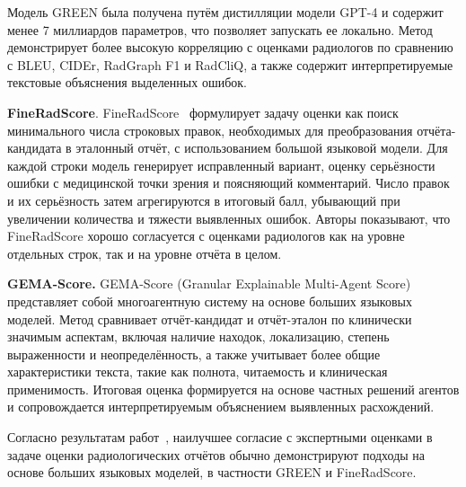 Модель GREEN была получена путём дистилляции модели GPT-4 и содержит менее 7 миллиардов параметров, что позволяет запускать ее локально. Метод демонстрирует более высокую корреляцию с оценками радиологов по сравнению с BLEU, CIDEr, RadGraph F1 и RadCliQ, а также содержит интерпретируемые текстовые объяснения выделенных ошибок.

\textbf{FineRadScore}. FineRadScore~\cite{pmlr-v252-huang24a} формулирует задачу оценки как поиск минимального числа строковых правок, необходимых для преобразования отчёта-кандидата в эталонный отчёт, с использованием большой языковой модели. Для каждой строки модель генерирует исправленный вариант, оценку серьёзности ошибки с медицинской точки зрения и поясняющий комментарий. Число правок и их серьёзность затем агрегируются в итоговый балл, убывающий при увеличении количества и тяжести выявленных ошибок. Авторы показывают, что FineRadScore хорошо согласуется с оценками радиологов как на уровне отдельных строк, так и на уровне отчёта в целом.

\textbf{GEMA-Score.} GEMA-Score (Granular Explainable Multi-Agent Score)~\cite{zhang2025gema}
представляет собой многоагентную систему на основе больших языковых моделей. Метод сравнивает отчёт-кандидат и отчёт-эталон по клинически значимым аспектам, включая наличие находок, локализацию, степень выраженности и неопределённость, а также учитывает более общие характеристики текста, такие как полнота, читаемость и клиническая применимость. Итоговая оценка формируется на основе частных решений агентов и сопровождается интерпретируемым объяснением выявленных расхождений.

Согласно результатам работ~\cite{yu2023evaluating,ostmeier2024green,pmlr-v252-huang24a,zhao2024ratescore}, наилучшее согласие с экспертными оценками в задаче оценки радиологических отчётов обычно демонстрируют подходы на основе больших языковых моделей, в частности GREEN и FineRadScore.
